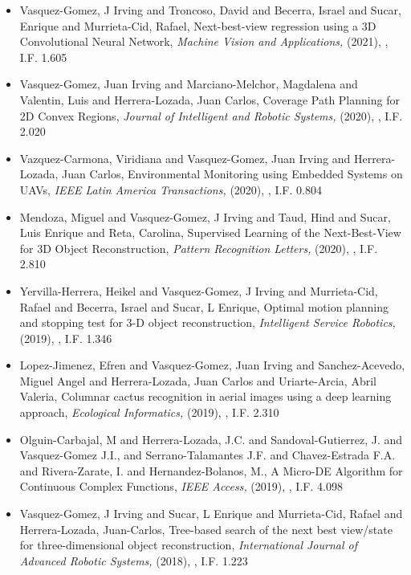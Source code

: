 \begin{itemize} 
\item Vasquez-Gomez, J Irving and Troncoso, David and Becerra, Israel and Sucar, Enrique and Murrieta-Cid, Rafael, Next-best-view regression using a 3D Convolutional Neural Network,\textit{ Machine Vision and Applications,} (2021), \href{https://doi.org/10.1007/s00138-020-01166-2} {\faFilePdfO}, I.F. 1.605 
\item Vasquez-Gomez, Juan Irving and Marciano-Melchor, Magdalena and Valentin, Luis and Herrera-Lozada, Juan Carlos, Coverage Path Planning for 2D Convex Regions,\textit{ Journal of Intelligent and Robotic Systems,} (2020), \href{https://doi.org/10.1007/s10846-019-01024-y} {\faFilePdfO}, I.F. 2.020 
\item Vazquez-Carmona, Viridiana and Vasquez-Gomez, Juan Irving and Herrera-Lozada, Juan Carlos, Environmental Monitoring using Embedded Systems on UAVs,\textit{ IEEE Latin America Transactions,} (2020), \href{https://doi.org/10.1109/TLA.2020.9085284} {\faFilePdfO}, I.F. 0.804 
\item Mendoza, Miguel and Vasquez-Gomez, J Irving and Taud, Hind and Sucar, Luis Enrique and Reta, Carolina, Supervised Learning of the Next-Best-View for 3D Object Reconstruction,\textit{ Pattern Recognition Letters,} (2020), \href{https://doi.org/10.1016/j.patrec.2020.02.024} {\faFilePdfO}, I.F. 2.810 
\item Yervilla-Herrera, Heikel and Vasquez-Gomez, J Irving and Murrieta-Cid, Rafael and Becerra, Israel and Sucar, L Enrique, Optimal motion planning and stopping test for 3-D object reconstruction,\textit{ Intelligent Service Robotics,} (2019), \href{https://doi.org/10.1007/s11370-018-0264-y} {\faFilePdfO}, I.F. 1.346 
\item Lopez-Jimenez, Efren and Vasquez-Gomez, Juan Irving and Sanchez-Acevedo, Miguel Angel and Herrera-Lozada, Juan Carlos and Uriarte-Arcia, Abril Valeria, Columnar cactus recognition in aerial images using a deep learning approach,\textit{ Ecological Informatics,} (2019), \href{https://doi.org/10.1016/j.ecoinf.2019.05.005} {\faFilePdfO}, I.F. 2.310 
\item Olguin-Carbajal, M and Herrera-Lozada, J.C. and Sandoval-Gutierrez, J. and Vasquez-Gomez J.I., and Serrano-Talamantes J.F. and Chavez-Estrada F.A. and Rivera-Zarate, I. and Hernandez-Bolanos, M., A Micro-DE Algorithm for Continuous Complex Functions,\textit{ IEEE Access,} (2019), \href{https://doi.org/10.1109/ACCESS.2019.2954296} {\faFilePdfO}, I.F. 4.098 
\item Vasquez-Gomez, J Irving and Sucar, L Enrique and Murrieta-Cid, Rafael and Herrera-Lozada, Juan-Carlos, Tree-based search of the next best view/state for three-dimensional object reconstruction,\textit{ International Journal of Advanced Robotic Systems,} (2018), \href{https://doi.org/10.1177/1729881418754575} {\faFilePdfO}, I.F. 1.223 

\end{itemize}
